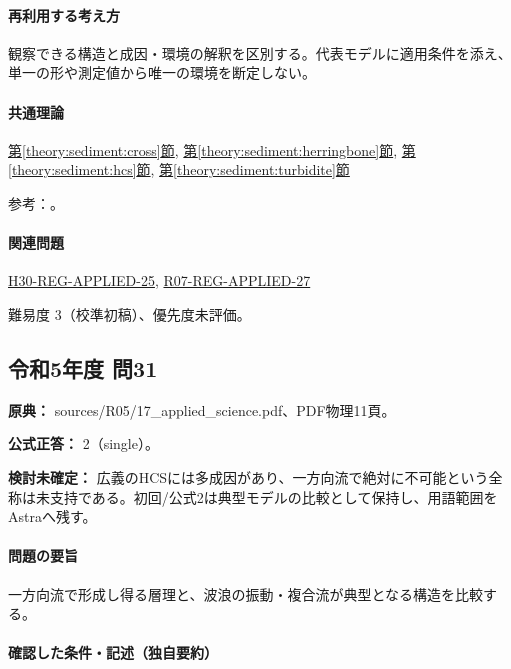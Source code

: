 \paragraph{再利用する考え方} 観察できる構造と成因・環境の解釈を区別する。代表モデルに適用条件を添え、単一の形や測定値から唯一の環境を断定しない。

\paragraph{共通理論} \hyperref[theory:sediment:cross]{第\ref*{theory:sediment:cross}節}, \hyperref[theory:sediment:herringbone]{第\ref*{theory:sediment:herringbone}節}, \hyperref[theory:sediment:hcs]{第\ref*{theory:sediment:hcs}節}, \hyperref[theory:sediment:turbidite]{第\ref*{theory:sediment:turbidite}節}

\par 参考：\cite{sed_mit_environment,sed_mit_cross,sed_houston_structures}。

\paragraph{関連問題} \hyperref[q:h30-reg-applied-25]{H30-REG-APPLIED-25}, \hyperref[q:r07-reg-applied-27]{R07-REG-APPLIED-27}

\par 難易度 3（校準初稿）、優先度未評価。

\subsection{令和5年度 問31}
\label{q:r05-reg-applied-31}

\noindent\textbf{原典：} sources/R05/17\_applied\_science.pdf、PDF物理11頁。

\textbf{公式正答：} 2（single）。

\par\textbf{検討未確定：} 広義のHCSには多成因があり、一方向流で絶対に不可能という全称は未支持である。初回/公式2は典型モデルの比較として保持し、用語範囲をAstraへ残す。

\paragraph{問題の要旨} 一方向流で形成し得る層理と、波浪の振動・複合流が典型となる構造を比較する。

\paragraph{確認した条件・記述（独自要約）}\mbox{}\par


